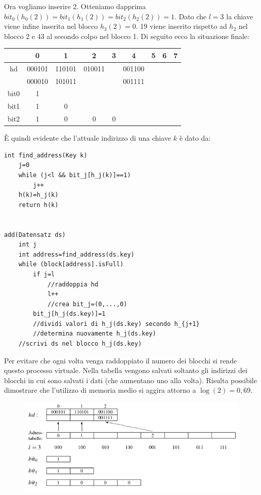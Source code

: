 \documentclass[a4paper]{book}
\begin{document}
Ora vogliamo inserire 2. Otteniamo dapprima $bit_0(h_0(2))=bit_1(h_1(2))=bit_2(h_2(2))=1$. Dato che $l=3$ la chiave viene infine inserita nel blocco $h_3(2)=0$. 19 viene inserito rispetto ad $h_2$ nel blocco 2 e 43 al secondo colpo nel blocco 1. Di seguito ecco la situazione finale:
\begin{center}
\begin{tabular}{|c|c|c|c|c|c|c|c|c|}
\hline 
  & 0 & 1 & 2 & 3 & 4 & 5 & 6 & 7 \\ 
\hline 
hd & 000101 & 110101 & 010011 &   & 001100 &   &   &   \\ 
\hline 
  & 000010 & 101011 &   &   & 001111 &   &   &   \\ 
\hline 
bit0 & 1 &   &   &   &   &   &   &   \\ 
\hline 
bit1 & 1 & 0 &   &   &   &   &   &   \\ 
\hline 
bit2 & 1 & 0 & 0 & 0 &   &   &   &   \\ 
\hline 
\end{tabular} \end{center}
È quindi evidente che l'attuale indirizzo di una chiave $k$ è dato da:
\begin{lstlisting}
int find_address(Key k)
	j=0
	while (j<l && bit_j[h_j(k)]==1)
		j++
	h(k)=h_j(k)
	return h(k)
	
	
add(Datensatz ds)
	int j
	int address=find_address(ds.key)
	while (block[address].isFull)
		if j=l
			//raddoppia hd
			l++
			//crea bit_j=(0,...,0)
		bit_j[h_j(ds.key)]=1
		//dividi valori di h_j(ds.key) secondo h_{j+1}
		//determina nuovamente h_j(ds.key)
	//scrivi ds nel blocco h_j(ds.key)			
\end{lstlisting}
Per evitare che ogni volta venga raddoppiato il numero dei blocchi si rende questo processo virtuale. Nella tabella vengono salvati soltanto gli indirizzi dei blocchi in cui sono salvati i dati (che aumentano uno alla volta). Risulta possibile dimostrare che l'utilizzo di memoria medio si aggira attorno a $\log(2)=0,69$.
\begin{figure}[H]
\centering
\includegraphics[scale=0.5]{Figures/virtuelleshashing.png}
\end{figure}
\end{document}
